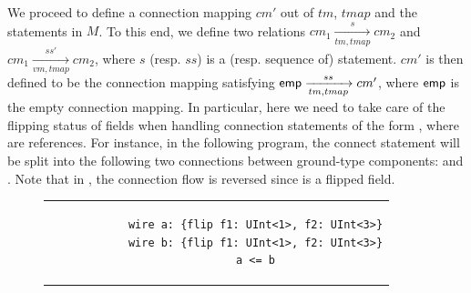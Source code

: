 

\newcommand{\conc}[1]{+\!+^{(#1)}}
\newcommand{\flipped}{\nabla}

We proceed to define a connection mapping $cm'$ out of $tm$, $tmap$ and the statements in $M$.
To this end, we define two relations $cm_1 \xrightarrow[tm, tmap]{s} cm_2$ and $cm_1 \xrightarrow[vm, tmap]{ss'} cm_2$, where $s$ (resp. $ss$) is a (resp. sequence of) statement.
$cm'$ is then defined to be the connection mapping satisfying ${\sf emp} \xrightarrow[tm, tmap]{ss} cm'$, where ${\sf emp}$ is the empty connection mapping.
%
%
%
%
%
%
%
In particular, here we need to take care of the flipping status of fields when handling %
connection statements of the form
, where  are references.
For instance, in the following {\hifirrtl} program, the connect statement  will be split into the following two connections between ground-type components:
 and .
Note that in , the connection flow is reversed since  is a flipped field.
%
\begin{figure}[htbp]
\vspace{-2mm}
	\begin{tabular}{c}
		\begin{lstlisting}
			wire a: {flip f1: UInt<1>, f2: UInt<3>}
			wire b: {flip f1: UInt<1>, f2: UInt<3>}
			a <= b
		\end{lstlisting}
	\end{tabular}
\vspace{-2mm}
\end{figure}

